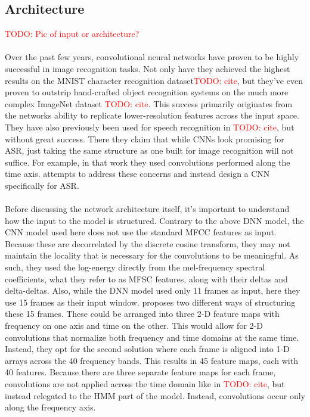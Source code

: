 \documentclass[letterpaper]{article}
\newcommand{\TODO}[1]{\textcolor{red}{TODO: #1}}
\begin{document}
\subsection*{Architecture}

\TODO{Pic of input or architecture?}

\paragraph{} Over the past few years, convolutional neural networks have proven to be highly successful in image recognition tasks. Not only have they achieved the highest results on the MNIST character recognition dataset\TODO{cite}, but they've even proven to outstrip hand-crafted object recognition systems on the much more complex ImageNet dataset \TODO{cite}. This success primarily originates from the networks ability to replicate lower-resolution features across the input space. They have also previously been used for speech recognition in \TODO{cite}, but without great success. There they claim that while CNNs look promising for ASR, just taking the same structure as one built for image recognition will not suffice. For example, in that work they used convolutions performed along the time axis. \cite{DBLP:journals/taslp/Abdel-HamidMJDPY14} attempts to address these concerns and instead design a CNN specifically for ASR.

\paragraph{} Before discussing the network architecture itself, it's important to understand how the input to the model is structured. Contrary to the above DNN model, the CNN model used here does not use the standard MFCC features as input. Because these are decorrelated by the discrete cosine transform, they may not maintain the locality that is necessary for the convolutions to be meaningful. As such, they used the log-energy directly from the mel-frequency spectral coefficients, what they refer to as MFSC features, along with their deltas and delta-deltas. Also, while the DNN model used only 11 frames as input, here they use 15 frames as their input window. \cite{DBLP:journals/taslp/Abdel-HamidMJDPY14} proposes two different ways of structuring these 15 frames. These could be arranged into three 2-D feature maps with frequency on one axis and time on the other. This would allow for 2-D convolutions that normalize both frequency and time domains at the same time. Instead, they opt for the second solution where each frame is aligned into 1-D arrays across the 40 frequency bands. This results in 45 feature maps, each with 40 features. Because there are three separate feature maps for each frame, convolutions are not applied across the time domain like in \TODO{cite}, but instead relegated to the HMM part of the model. Instead, convolutions occur only along the frequency axis.
\end{document}
